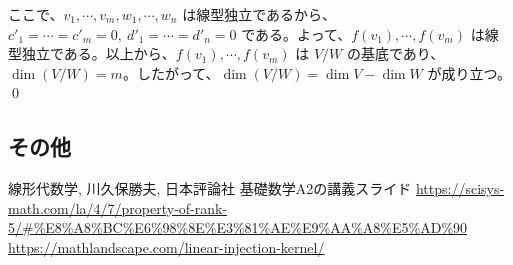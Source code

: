 \documentclass[a4paper,11pt]{jsarticle}
\numberwithin{equation}{section}
\begin{document}
ここで、$v_1, \cdots , v_m, w_1, \cdots , w_n$ は線型独立であるから、$c'_1 = \cdots = c'_m = 0, \ d'_1 = \cdots = d'_n = 0$ である。よって、$f(v_1), \cdots , f(v_m)$ は線型独立である。以上から、$f(v_1), \cdots , f(v_m)$ は $V / W$ の基底であり、$\dim (V / W) = m$。したがって、$\dim (V / W) = \dim V - \dim W$ が成り立つ。 \qed


\subsection{その他}

\begin{thebibliography}{99}
   線形代数学, 川久保勝夫, 日本評論社
   基礎数学A2の講義スライド
   \url{https://scisys-math.com/la/4/7/property-of-rank-5/#%E8%A8%BC%E6%98%8E%E3%81%AE%E9%AA%A8%E5%AD%90}
   \url{https://mathlandscape.com/linear-injection-kernel/}
\end{thebibliography}
\end{document}
